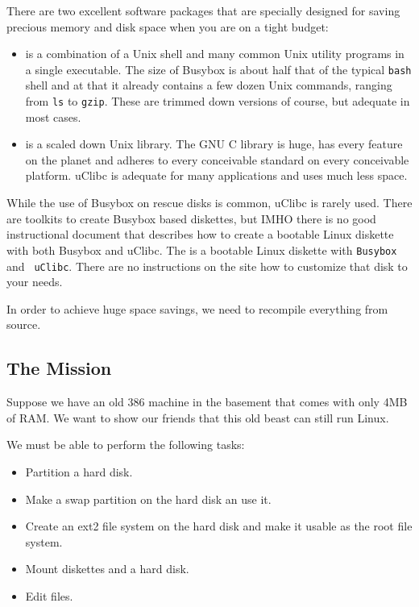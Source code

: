 \documentclass[12pt,a4paper]{article}
\begin{document}
There are two excellent software packages that are specially designed
for saving precious memory and disk space when you are on a tight budget:
\begin{itemize}
\item {} is a
  combination of a Unix shell and many common Unix utility programs in
  a single executable. The size of Busybox is about half that of the
  typical {\tt bash} shell and at that it already contains a few dozen
  Unix commands, ranging from {\tt ls} to {\tt gzip}. These are
  trimmed down versions of course, but adequate in most cases.
\item {} is a
  scaled down Unix library. The GNU C library is huge, has every
  feature on the planet and adheres to every conceivable standard on
  every conceivable platform. uClibc is adequate for many applications
  and uses much less space.
\end{itemize}
While the use of Busybox on rescue disks is common, uClibc is rarely
used. There are toolkits to create Busybox based diskettes, but IMHO
there is no good instructional document that describes how to create a
bootable Linux diskette with both Busybox and uClibc. The 
is a bootable Linux diskette with {\tt Busybox} and {\tt
uClibc}. There are no instructions on the site how to
customize that disk to your needs.

In order to achieve huge space savings, we need to recompile
everything from source.

\subsection{The Mission}

Suppose we have an old 386 machine in the basement that comes with
only 4MB of RAM. We want to show our friends that this old beast can
still run Linux. 

We must be able to perform the following tasks:
\begin{itemize}
\item Partition a hard disk.
\item Make a swap partition on the hard disk an use it.
\item Create an ext2 file system on the hard disk and make it usable as the
  root file system. 
\item Mount diskettes and a hard disk.
\item Edit files.
\end{itemize}
\end{document}
